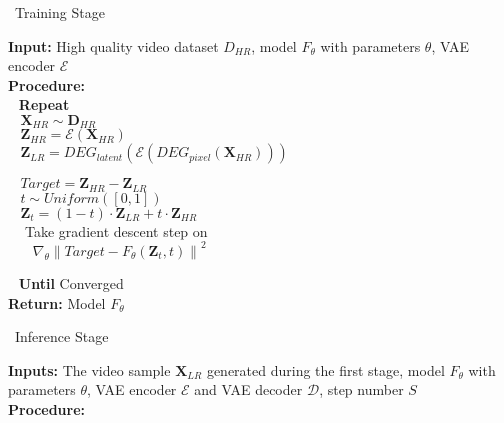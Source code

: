 \begin{center}

\begin{minipage}[t]{0.5\linewidth}

  \centering
  \scalebox{0.86}
  {
  \begin{algorithm}[H]
    \caption{\small{~Training Stage}} \label{alg:train}
    \small{
    \textbf{Input: } High quality video dataset $D_{HR}$, model $F_\theta$ with parameters $\theta$, VAE encoder $\mathcal{E}$ \\
    \textbf{Procedure: }\\
    $\:\:$ \textbf{Repeat} \\
    $\:\:\:\: \mathbf{X}_{HR} \sim \mathbf{D}_{HR}$ \\
    $\:\:\:\: \mathbf{Z}_{HR} = \mathcal{E}(\mathbf{X}_{HR})$ \\
    $\:\:\:\: \mathbf{Z}_{LR} = DEG_{latent}(\mathcal{E} (DEG_{pixel}(\mathbf{X}_{HR})))$
    
    $\:\:\:\: Target =  \mathbf{Z}_{HR} - \mathbf{Z}_{LR}$ \\
    $\:\:\:\: t \sim  Uniform([0,1])$ \\
    $\:\:\:\: \mathbf{Z}_{t} = (1 - t) \cdot \mathbf{Z}_{LR} + t \cdot \mathbf{Z}_{HR}$ \\
    $\:\:\:\:$ Take gradient descent step on \\
    $\:\:\:\:\:\:\:\: \nabla_\theta \left\| Target - F_\theta\left( \mathbf{Z}_{t}, t \right) \right\|^2 $

    $\:\:$ \textbf{Until} Converged \\
    \textbf{Return:} Model $F_\theta$
    }
  \end{algorithm}
  }
\end{minipage}%
\begin{minipage}[t]{0.5\linewidth}
  \centering
  \scalebox{0.81}
  {
  \begin{algorithm}[H]
    \caption{\small{~Inference Stage}} \label{alg:inf}
    \small{
    \textbf{Inputs: } The video sample $\mathbf{X}_{LR}$ generated during the first stage, model $F_\theta$ with parameters $\theta$, VAE encoder $\mathcal{E}$ and VAE decoder $\mathcal{D}$, step number $S$  \\
    \textbf{Procedure: }\\

}
\end{algorithm}}
\end{minipage}
\end{center}
